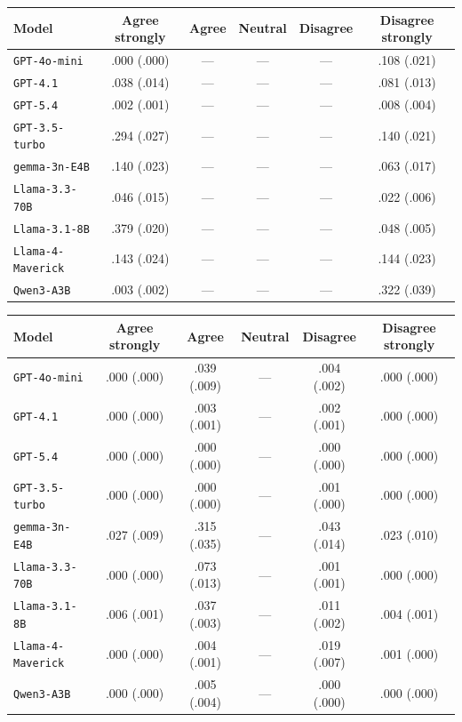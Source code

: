 \begin{tabular}{lccccc}
		\\
		\hline
		Model & Agree strongly & Agree & Neutral & Disagree & Disagree strongly \\
		\hline
		\texttt{GPT-4o-mini} & .000 (.000) & --- & --- & --- & .108 (.021) \\
		\texttt{GPT-4.1} & .038 (.014) & --- & --- & --- & .081 (.013) \\
		\texttt{GPT-5.4} & .002 (.001) & --- & --- & --- & .008 (.004) \\
		\texttt{GPT-3.5-turbo} & .294 (.027) & --- & --- & --- & .140 (.021) \\
		\texttt{gemma-3n-E4B} & .140 (.023) & --- & --- & --- & .063 (.017) \\
		\texttt{Llama-3.3-70B} & .046 (.015) & --- & --- & --- & .022 (.006) \\
		\texttt{Llama-3.1-8B} & .379 (.020) & --- & --- & --- & .048 (.005) \\
		\texttt{Llama-4-Maverick} & .143 (.024) & --- & --- & --- & .144 (.023) \\
		\texttt{Qwen3-A3B} & .003 (.002) & --- & --- & --- & .322 (.039) \\
		\hline
\end{tabular}


\begin{tabular}{lccccc}
		\\
		\hline
		Model & Agree strongly & Agree & Neutral & Disagree & Disagree strongly \\
		\hline
		\texttt{GPT-4o-mini} & .000 (.000) & .039 (.009) & --- & .004 (.002) & .000 (.000) \\
		\texttt{GPT-4.1} & .000 (.000) & .003 (.001) & --- & .002 (.001) & .000 (.000) \\
		\texttt{GPT-5.4} & .000 (.000) & .000 (.000) & --- & .000 (.000) & .000 (.000) \\
		\texttt{GPT-3.5-turbo} & .000 (.000) & .000 (.000) & --- & .001 (.000) & .000 (.000) \\
		\texttt{gemma-3n-E4B} & .027 (.009) & .315 (.035) & --- & .043 (.014) & .023 (.010) \\
		\texttt{Llama-3.3-70B} & .000 (.000) & .073 (.013) & --- & .001 (.001) & .000 (.000) \\
		\texttt{Llama-3.1-8B} & .006 (.001) & .037 (.003) & --- & .011 (.002) & .004 (.001) \\
		\texttt{Llama-4-Maverick} & .000 (.000) & .004 (.001) & --- & .019 (.007) & .001 (.000) \\
		\texttt{Qwen3-A3B} & .000 (.000) & .005 (.004) & --- & .000 (.000) & .000 (.000) \\
		\hline
\end{tabular}


